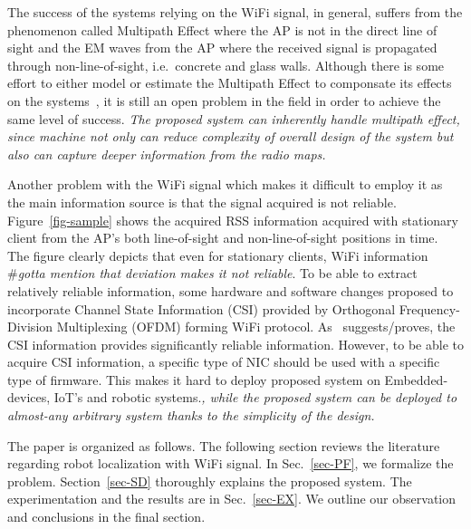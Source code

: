 \documentclass[letterpaper, 10 pt, conference]{ieeeconf}  %
\begin{document}
  The success of the systems relying on the WiFi signal, in general, suffers from the phenomenon called Multipath Effect where the AP is not in the direct line of sight and the EM waves from the AP where the received signal is propagated through non-line-of-sight, i.e.~concrete and glass walls.
  Although there is some effort to either model or estimate the Multipath Effect to componsate its effects on the systems~\cite{cai2015identification}, it is still an open problem in the field in order to achieve the same level of success.
  \textit{The proposed system can inherently handle multipath effect, since machine not only can reduce complexity of overall design of the system but also can capture deeper information from the radio maps.}

  Another problem with the WiFi signal which makes it difficult to employ it as the main information source is that the signal acquired is not reliable.
  Figure~\ref{fig-sample} shows the acquired RSS information acquired with stationary client from the AP's both line-of-sight and non-line-of-sight positions in time.
  The figure clearly depicts that even for stationary clients, WiFi information \#\textit{gotta mention that deviation makes it not reliable}.
  To be able to extract relatively reliable information, some hardware and software changes proposed to incorporate Channel State Information (CSI) provided by Orthogonal Frequency-Division Multiplexing (OFDM) forming WiFi protocol.
  As~\cite{gao2015channel} suggests/proves, the CSI information provides significantly reliable information.
  However, to be able to acquire CSI information, a specific type of NIC should be used with a specific type of firmware.
  This makes it hard to deploy proposed system on Embedded-devices, IoT's and robotic systems.\textit{, while the proposed system can be deployed to almost-any arbitrary system thanks to the simplicity of the design.}


  The paper is organized as follows.
  The following section reviews the literature regarding robot localization with WiFi signal.
  In Sec.~\ref{sec-PF}, we formalize the problem.
  Section~\ref{sec-SD} thoroughly explains the proposed system.
  The experimentation and the results are  in Sec.~\ref{sec-EX}.
  We outline our observation and conclusions in the final section.
\end{document}

